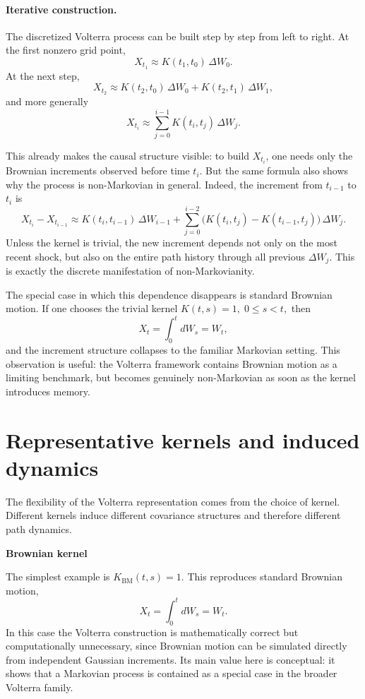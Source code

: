 \documentclass[a4paper,10pt,titlepage,oneside,openany]{book}
\theoremstyle{plain}
\theoremstyle{definition}
\theoremstyle{remark}
\newcommand{\1}{\mathbf{1}}
\begin{document}
\paragraph{Iterative construction.}

The discretized Volterra process can be built step by step from left to right. At the first nonzero grid point,
\[
X_{t_1}\approx K(t_1,t_0)\,\Delta W_0.
\]
At the next step,
\[
X_{t_2}\approx K(t_2,t_0)\,\Delta W_0 + K(t_2,t_1)\,\Delta W_1,
\]
and more generally
\[
X_{t_i}\approx \sum_{j=0}^{i-1} K(t_i,t_j)\,\Delta W_j.
\]

This already makes the causal structure visible: to build \(X_{t_i}\), one needs only the Brownian increments observed before time \(t_i\). But the same formula also shows why the process is non-Markovian in general. Indeed, the increment from \(t_{i-1}\) to \(t_i\) is
\[
X_{t_i}-X_{t_{i-1}}
\approx
K(t_i,t_{i-1})\,\Delta W_{i-1}
+
\sum_{j=0}^{i-2}
\bigl(K(t_i,t_j)-K(t_{i-1},t_j)\bigr)\,\Delta W_j.
\]
Unless the kernel is trivial, the new increment depends not only on the most recent shock, but also on the entire path history through all previous \(\Delta W_j\). This is exactly the discrete manifestation of non-Markovianity.

The special case in which this dependence disappears is standard Brownian motion. If one chooses the trivial kernel
\(
K(t,s)=1,
\; 0\le s<t,
\)
then
\[
X_t=\int_0^t dW_s = W_t,
\]
and the increment structure collapses to the familiar Markovian setting. This observation is useful: the Volterra framework contains Brownian motion as a limiting benchmark, but becomes genuinely non-Markovian as soon as the kernel introduces memory.
\section{Representative kernels and induced dynamics}

The flexibility of the Volterra representation comes from the choice of kernel. Different kernels induce different covariance structures and therefore different path dynamics.

\textbf{Brownian kernel}

The simplest example is
\(
K_{\mathrm{BM}}(t,s)=1.
\)
This reproduces standard Brownian motion,
\[
X_t=\int_0^t dW_s=W_t.
\]
In this case the Volterra construction is mathematically correct but computationally unnecessary, since Brownian motion can be simulated directly from independent Gaussian increments. Its main value here is conceptual: it shows that a Markovian process is contained as a special case in the broader Volterra family.
\end{document}
